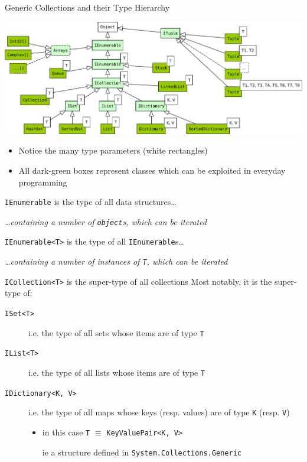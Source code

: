 \documentclass[presentation]{beamer}
\begin{document}
\begin{frame}[allowframebreaks]{Generic Collections and their Type Hierarchy}
  \begin{center}
    \includegraphics[width=\linewidth]{img/dotnet-collections.pdf}
  \end{center}
  \begin{itemize}
    \item Notice the many \alert{type parameters} (white rectangles)
    \item All dark-green boxes represent classes which can be exploited in everyday programming
  \end{itemize}

  \begin{block}{\texttt{IEnumerable} is the type of all data structures\ldots}
    \begin{center}\itshape
      \ldots containing a number of \alert{\texttt{object}s}, which can be \alert{iterated}
    \end{center}
  \end{block}

  \begin{block}{\texttt{IEnumerable<T>} is the type of all \texttt{IEnumerable}s\ldots}
    \begin{center}\itshape
      \ldots containing a number of instances of \alert{\texttt{T}}, which can be \alert{iterated}
    \end{center}
  \end{block}

  \begin{block}{\texttt{ICollection<T>} is the super-type of all collections}
    Most notably, it is the super-type of:
    \begin{description}
      \item[\texttt{ISet<T>}] i.e. the type of all \alert{sets} whose items are of type \alert{\texttt{T}}
      \item[\texttt{IList<T>}] i.e. the type of all \alert{lists} whose items are of type \alert{\texttt{T}} 
      \item[\texttt{IDictionary<K, V>}] i.e. the type of all \alert{maps} whose \alert{keys} (resp. \alert{values}) are of type \alert{\texttt{K}} (resp. \alert{\texttt{V}})
      \begin{itemize}
        \item in this case \texttt{T} $\equiv$ \texttt{\alert{KeyValuePair<K, V>}}
        \item[ie] a structure defined in \texttt{System.Collections.Generic}
      \end{itemize} 
    \end{description}
  \end{block}


\end{frame}
\end{document}
